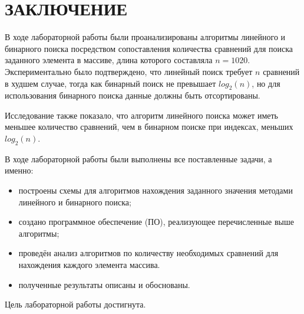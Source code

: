 \chapter*{ЗАКЛЮЧЕНИЕ}

В ходе лабораторной работы были проанализированы алгоритмы линейного и бинарного поиска посредством сопоставления количества сравнений для поиска заданного элемента в массиве, длина которого составляла $n = 1020$. Экспериментально было подтверждено, что линейный поиск требует $n$ сравнений в худшем случае, тогда как бинарный поиск не превышает $log_2(n)$, но для использования бинарного поиска данные должны быть отсортированы.

Исследование также показало, что алгоритм линейного поиска может иметь меньшее количество сравнений, чем в бинарном поиске при индексах, меньших $log_2(n)$.

В ходе лабораторной работы были выполнены все поставленные задачи, а именно:
\begin{itemize}[label=--]
    \item построены схемы для алгоритмов нахождения заданного значения методами линейного и бинарного поиска;
    \item создано программное обеспечение (ПО), реализующее перечисленные выше алгоритмы;
    \item проведён анализ алгоритмов по количеству необходимых сравнений для нахождения каждого элемента массива.
    \item полученные результаты описаны и обоснованы.
\end{itemize}

Цель лабораторной работы достигнута.
